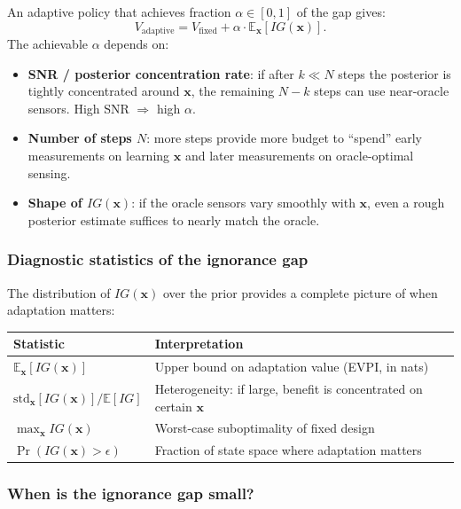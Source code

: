\documentclass[11pt,a4paper]{article}
\newcommand{\E}{\mathbb{E}}
\begin{document}
An adaptive policy that achieves fraction $\alpha \in [0,1]$ of the gap gives:
\begin{equation}
  V_{\text{adaptive}} = V_{\text{fixed}} + \alpha \cdot \E_{\bm{x}}[IG(\bm{x})].
\end{equation}
The achievable $\alpha$ depends on:
\begin{itemize}[nosep]
  \item \textbf{SNR / posterior concentration rate}: if after $k \ll N$ steps the posterior is tightly concentrated around $\bm{x}$, the remaining $N - k$ steps can use near-oracle sensors.  High SNR $\Rightarrow$ high $\alpha$.
  \item \textbf{Number of steps $N$}: more steps provide more budget to ``spend'' early measurements on learning $\bm{x}$ and later measurements on oracle-optimal sensing.
  \item \textbf{Shape of $IG(\bm{x})$}: if the oracle sensors vary smoothly with $\bm{x}$, even a rough posterior estimate suffices to nearly match the oracle.
\end{itemize}

\subsubsection{Diagnostic statistics of the ignorance gap}

The distribution of $IG(\bm{x})$ over the prior provides a complete picture of when adaptation matters:

\begin{center}
\begin{tabular}{@{}ll@{}}
\toprule
Statistic & Interpretation \\
\midrule
$\E_{\bm{x}}[IG(\bm{x})]$ & Upper bound on adaptation value (EVPI, in nats) \\
$\text{std}_{\bm{x}}[IG(\bm{x})] / \E[IG]$ & Heterogeneity: if large, benefit is concentrated on certain $\bm{x}$ \\
$\max_{\bm{x}} IG(\bm{x})$ & Worst-case suboptimality of fixed design \\
$\Pr(IG(\bm{x}) > \epsilon)$ & Fraction of state space where adaptation matters \\
\bottomrule
\end{tabular}
\end{center}

\subsubsection{When is the ignorance gap small?}
\end{document}

